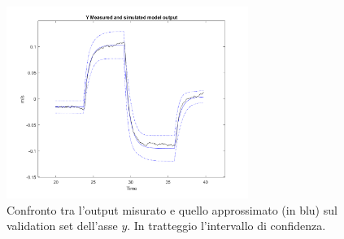 \begin{figure}
    \centering
    \includegraphics[width=0.7\textwidth]{figs/chapter4/valytimeplot.png}
    \caption{Confronto tra l'output misurato e quello approssimato (in blu) sul validation set dell'asse $y$. In tratteggio l'intervallo di confidenza.}
    \label{fig:yvalerr}
\end{figure}

